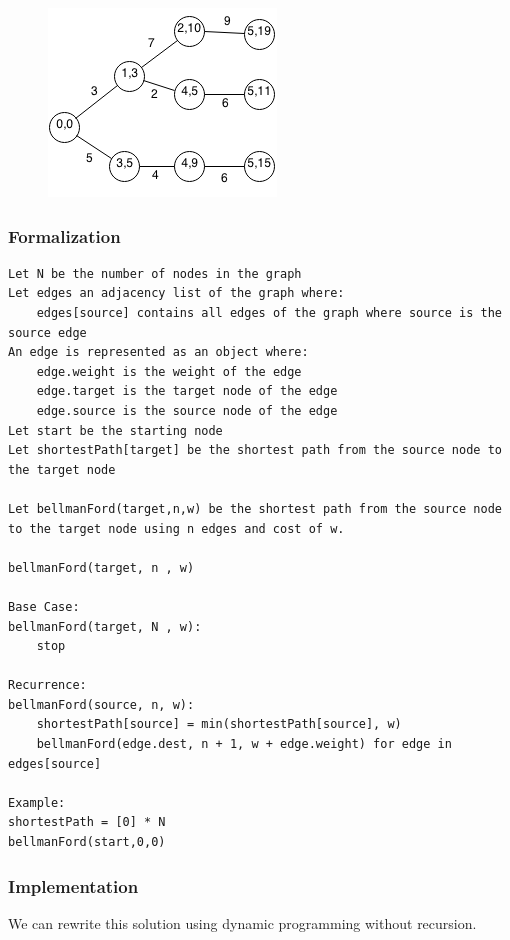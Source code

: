 \documentclass[11pt,oneside]{book}
\makeatletter
\def\maxwidth#1{\ifdim\Gin@nat@width>#1 #1\else\Gin@nat@width\fi}
\makeatother
\begin{document}
\vspace{5px}\begin{figure}[H]\centering
        \includegraphics[width=0.66\maxwidth{\textwidth}]{bellmanford5.png}
        \end{figure}

\subsubsection{Formalization}

\begin{lstlisting}
Let N be the number of nodes in the graph
Let edges an adjacency list of the graph where:
    edges[source] contains all edges of the graph where source is the source edge
An edge is represented as an object where:
    edge.weight is the weight of the edge
    edge.target is the target node of the edge
    edge.source is the source node of the edge
Let start be the starting node
Let shortestPath[target] be the shortest path from the source node to the target node

Let bellmanFord(target,n,w) be the shortest path from the source node to the target node using n edges and cost of w.

bellmanFord(target, n , w)

Base Case:
bellmanFord(target, N , w):
    stop

Recurrence:
bellmanFord(source, n, w):
    shortestPath[source] = min(shortestPath[source], w)
    bellmanFord(edge.dest, n + 1, w + edge.weight) for edge in edges[source]

Example:
shortestPath = [0] * N
bellmanFord(start,0,0)
\end{lstlisting}

\subsubsection{Implementation}

We can rewrite this solution using dynamic programming without recursion.
\end{document}
